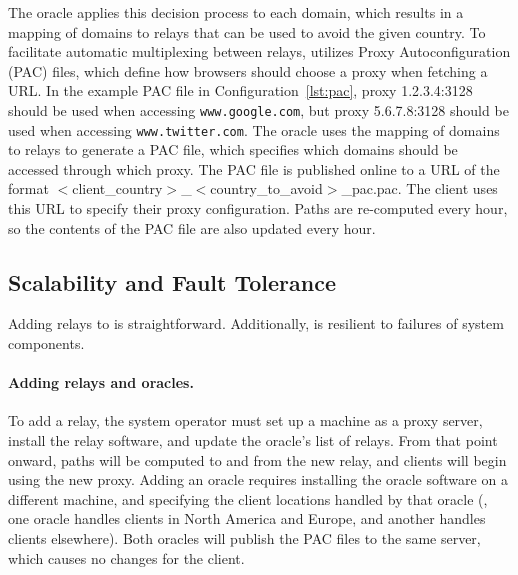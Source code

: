 The oracle applies this decision process to each domain, which results
in a mapping of domains to relays that can be used to avoid the given
country.  To facilitate automatic multiplexing between relays,
\system{} utilizes Proxy Autoconfiguration (PAC) files, which define
how browsers should choose a proxy when fetching a URL.  In the
example PAC file in Configuration~\ref{lst:pac}, proxy 1.2.3.4:3128
should be used when accessing {\tt www.google.com}, but proxy
5.6.7.8:3128 should be used when accessing {\tt www.twitter.com}.  The
oracle uses the mapping of domains to relays to generate a PAC file,
which specifies which domains should be accessed through which proxy.
The PAC file is published online to a URL of the format
$<$client\_country$>$\_$<$country\_to\_avoid$>$\_pac.pac.  The client
uses this URL to specify their proxy configuration.  Paths are
re-computed every hour, so the contents of the PAC file are also
updated every hour.

\renewcommand{\lstlistingname}{Configuration}


\subsection{Scalability and Fault Tolerance}
Adding relays to \system{} is 
straightforward. Additionally, \system{} is resilient to failures of system components.

\paragraph{Adding relays and oracles.} To add a relay, the system
operator must set up a machine as a proxy server, install the relay
software, and update the oracle's list of relays.  From that point
onward, paths will be computed to and from the new relay, and clients
will begin using the new proxy.  Adding an oracle requires installing
the oracle software on a different machine, and specifying the client
locations handled by that oracle (\eg, one oracle handles clients in
North America and Europe, and another handles clients elsewhere).
Both oracles will publish the PAC files to the same server, which
causes no changes for the client.

